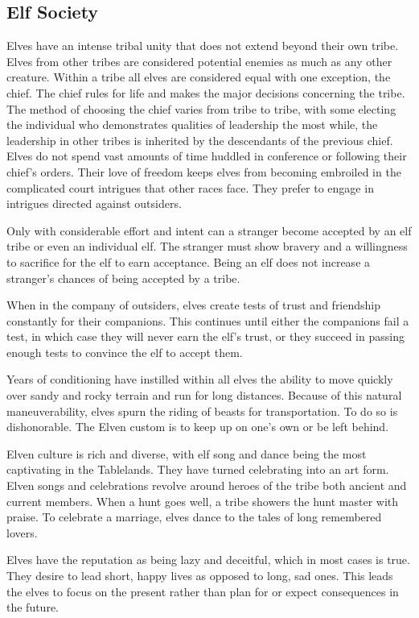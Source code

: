 \subsection{Elf Society}
Elves have an intense tribal unity that does not extend beyond their own tribe. Elves from other tribes are considered potential enemies as much as any other creature. Within a tribe all elves are considered equal with one exception, the chief. The chief rules for life and makes the major decisions concerning the tribe. The method of choosing the chief varies from tribe to tribe, with some electing the individual who demonstrates qualities of leadership the most while, the leadership in other tribes is inherited by the descendants of the previous chief. Elves do not spend vast amounts of time huddled in conference or following their chief's orders. Their love of freedom keeps elves from becoming embroiled in the complicated court intrigues that other races face. They prefer to engage in intrigues directed against outsiders.

Only with considerable effort and intent can a stranger become accepted by an elf tribe or even an individual elf. The stranger must show bravery and a willingness to sacrifice for the elf to earn acceptance. Being an elf does not increase a stranger's chances of being accepted by a tribe.

When in the company of outsiders, elves create tests of trust and friendship constantly for their companions. This continues until either the companions fail a test, in which case they will never earn the elf's trust, or they succeed in passing enough tests to convince the elf to accept them.

Years of conditioning have instilled within all elves the ability to move quickly over sandy and rocky terrain and run for long distances. Because of this natural maneuverability, elves spurn the riding of beasts for transportation. To do so is dishonorable. The Elven custom is to keep up on one's own or be left behind.

Elven culture is rich and diverse, with elf song and dance being the most captivating in the Tablelands. They have turned celebrating into an art form. Elven songs and celebrations revolve around heroes of the tribe both ancient and current members. When a hunt goes well, a tribe showers the hunt master with praise. To celebrate a marriage, elves dance to the tales of long remembered lovers.

Elves have the reputation as being lazy and deceitful, which in most cases is true. They desire to lead short, happy lives as opposed to long, sad ones. This leads the elves to focus on the present rather than plan for or expect consequences in the future.

